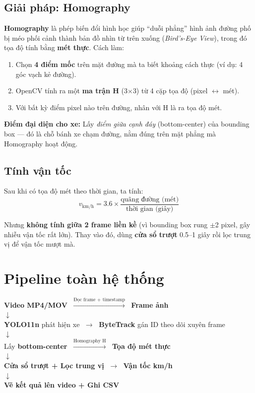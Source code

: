 \documentclass[11pt,a4paper]{article}
\begin{document}
\subsection{Giải pháp: Homography}
\textbf{Homography} là phép biến đổi hình học giúp ``duỗi phẳng'' hình ảnh đường phố bị méo phối cảnh thành bản đồ nhìn từ trên xuống (\textit{Bird's-Eye View}), trong đó tọa độ tính bằng \textbf{mét thực}. Cách làm:
\begin{enumerate}
    \item Chọn \textbf{4 điểm mốc} trên mặt đường mà ta biết khoảng cách thực (ví dụ: 4 góc vạch kẻ đường).
    \item OpenCV tính ra một \textbf{ma trận H} (3$\times$3) từ 4 cặp tọa độ (pixel $\leftrightarrow$ mét).
    \item Với bất kỳ điểm pixel nào trên đường, nhân với H là ra tọa độ mét.
\end{enumerate}

\textbf{Điểm đại diện cho xe:} Lấy \textit{điểm giữa cạnh đáy} (bottom-center) của bounding box --- đó là chỗ bánh xe chạm đường, nằm đúng trên mặt phẳng mà Homography hoạt động.

\subsection{Tính vận tốc}
Sau khi có tọa độ mét theo thời gian, ta tính:
$$v_{\text{km/h}} = 3.6 \times \frac{\text{quãng đường (mét)}}{\text{thời gian (giây)}}$$

Nhưng \textbf{không tính giữa 2 frame liền kề} (vì bounding box rung $\pm$2 pixel, gây nhiễu vận tốc rất lớn). Thay vào đó, dùng \textbf{cửa sổ trượt} 0.5--1 giây rồi lọc trung vị để vận tốc mượt mà.

\section{Pipeline toàn hệ thống}

\begin{tcolorbox}[commonbox, colback=white, colframe=primary, width=0.98\textwidth]
\centering\sffamily\small
\textbf{Video MP4/MOV} $\;\xrightarrow{\text{Đọc frame + timestamp}}\;$
\textbf{Frame ảnh}\\[4pt]
$\downarrow$\\[2pt]
\textbf{YOLO11n} phát hiện xe $\;\rightarrow\;$
\textbf{ByteTrack} gán ID theo dõi xuyên frame\\[4pt]
$\downarrow$\\[2pt]
Lấy \textbf{bottom-center} $\;\xrightarrow{\text{Homography H}}\;$
\textbf{Tọa độ mét thực}\\[4pt]
$\downarrow$\\[2pt]
\textbf{Cửa sổ trượt + Lọc trung vị} $\;\rightarrow\;$
\textbf{Vận tốc km/h}\\[4pt]
$\downarrow$\\[2pt]
\textbf{Vẽ kết quả lên video + Ghi CSV}
\end{tcolorbox}
\end{document}
